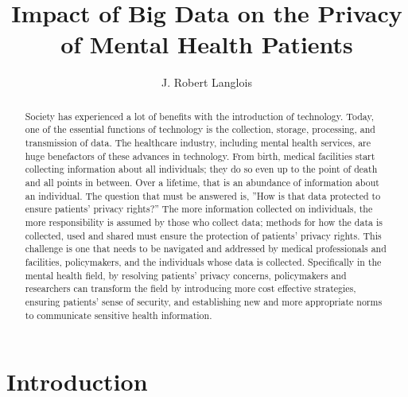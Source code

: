 \documentclass[sigconf]{acmart}
\begin{document}
\title{Impact of Big Data on the Privacy of Mental Health Patients}


\author{J. Robert Langlois}

\begin{abstract}
Society has experienced a lot of benefits with the introduction of technology. Today, one of the essential functions of technology is the collection, storage, processing, and transmission of data. The healthcare industry, including mental health services, are huge benefactors of these advances in technology. From birth, medical facilities start collecting information about all individuals; they do so even up to the point of death and all points in between. Over a lifetime, that is an abundance of information about an individual. The question that must be answered is, ''How is that data protected to ensure patients' privacy rights?'' The more information collected on individuals, the more responsibility is assumed by those who collect data; methods for how the data is collected, used and shared must ensure the protection of patients' privacy rights. This challenge is one that needs to be navigated and addressed by medical professionals and facilities, policymakers, and the individuals whose data is collected. Specifically in the mental health field, by resolving patients' privacy concerns, policymakers and researchers can transform the field by introducing more cost effective strategies, ensuring patients' sense of security, and establishing new and more appropriate norms to communicate sensitive health information.        
\end{abstract}

\maketitle

\section{Introduction}
\end{document}
